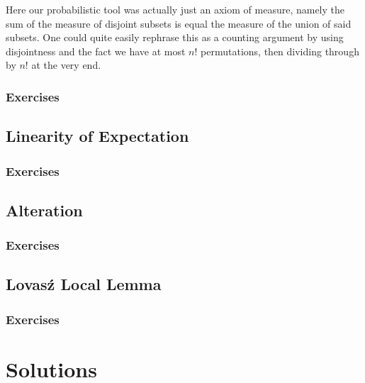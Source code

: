 \documentclass{article}
\begin{document}
Here our probabilistic tool was actually just an axiom of measure, namely the sum of the measure of disjoint 
subsets is equal the measure of the union of said subsets. One could quite easily rephrase this as a counting argument 
by using disjointness and the fact we have at most $n!$ permutations, then dividing through by $n!$ at the very end. 

\subsubsection*{Exercises}

\newpage

\subsection{Linearity of Expectation}

\subsubsection*{Exercises}

\newpage

\subsection{Alteration}

\subsubsection*{Exercises}

\newpage

\subsection{Lovas\'{z} Local Lemma}

\subsubsection*{Exercises}

\newpage

\section{Solutions}
\end{document}
